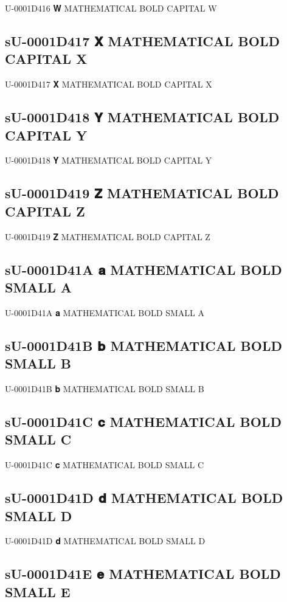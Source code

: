 U-0001D416 𝐖 MATHEMATICAL BOLD CAPITAL W

\subsection{sU-0001D417 𝐗 MATHEMATICAL BOLD CAPITAL X}

U-0001D417 𝐗 MATHEMATICAL BOLD CAPITAL X

\subsection{sU-0001D418 𝐘 MATHEMATICAL BOLD CAPITAL Y}

U-0001D418 𝐘 MATHEMATICAL BOLD CAPITAL Y

\subsection{sU-0001D419 𝐙 MATHEMATICAL BOLD CAPITAL Z}

U-0001D419 𝐙 MATHEMATICAL BOLD CAPITAL Z

\subsection{sU-0001D41A 𝐚 MATHEMATICAL BOLD SMALL A}

U-0001D41A 𝐚 MATHEMATICAL BOLD SMALL A

\subsection{sU-0001D41B 𝐛 MATHEMATICAL BOLD SMALL B}

U-0001D41B 𝐛 MATHEMATICAL BOLD SMALL B

\subsection{sU-0001D41C 𝐜 MATHEMATICAL BOLD SMALL C}

U-0001D41C 𝐜 MATHEMATICAL BOLD SMALL C

\subsection{sU-0001D41D 𝐝 MATHEMATICAL BOLD SMALL D}

U-0001D41D 𝐝 MATHEMATICAL BOLD SMALL D

\subsection{sU-0001D41E 𝐞 MATHEMATICAL BOLD SMALL E}

